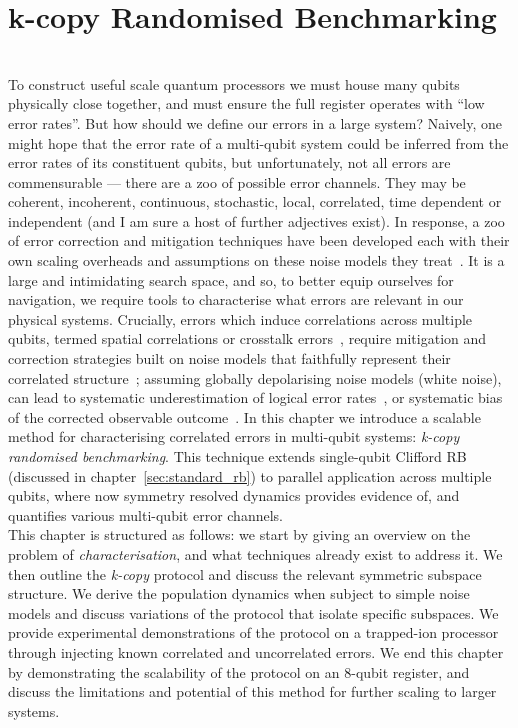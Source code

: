 \chapter{k-copy Randomised Benchmarking}
\minitoc
 \\
To construct useful scale quantum processors we must house many qubits physically close together, and must ensure the full register operates with ``low error rates''. But how should we define our errors in a large system? Naively, one might hope that the error rate of a multi-qubit system could be inferred from the error rates of its constituent qubits, but unfortunately, not all errors are commensurable --- there are a zoo of possible error channels. They may be coherent, incoherent, continuous, stochastic, local, correlated, time dependent or independent (and I am sure a host of further adjectives exist).  In response, a zoo of error correction and mitigation techniques have been developed each with their own scaling overheads and assumptions on these noise models they treat~\cite{shor_fault-tolerant_1996,aharonov_fault-tolerant_2008,cai_quantum_2023}.
It is a large and intimidating search space, and so, to better equip ourselves for navigation, we require tools to characterise what errors are relevant in our physical systems. 
Crucially, errors
which induce correlations across multiple qubits, termed spatial correlations or crosstalk errors~\cite{zou_spatially_2024, sarovar_detecting_2020}, require mitigation and correction strategies built on noise
models that faithfully represent their correlated structure~\cite{layden_efficient_2020}; assuming
globally depolarising noise models (white noise), can lead to systematic underestimation of logical error rates~\cite{aharonov_fault-tolerant_2006, preskill_sufficient_2013}, or systematic bias of the corrected observable outcome~\cite{foldager_can_2024}.
In this chapter we introduce a scalable method for characterising correlated errors in multi-qubit systems: \emph{k-copy randomised benchmarking}. This technique extends single-qubit
Clifford RB~\cite{magesan_scalable_2011,knill_randomized_2008,dankert_exact_2009} (discussed in chapter~\ref{sec:standard_rb}) to parallel application across multiple qubits, where now symmetry resolved dynamics provides evidence of, and quantifies various multi-qubit error channels.\\
This chapter is structured as follows: we start by giving an overview on the problem of \emph{characterisation}, and what techniques already exist to address it. We then outline the \emph{k-copy} protocol and discuss the relevant symmetric subspace structure. We derive the population dynamics when subject to simple noise models and discuss variations of the protocol that isolate specific subspaces. We provide experimental demonstrations of the protocol on a trapped-ion processor through injecting known correlated and uncorrelated errors. We end this chapter by demonstrating the scalability of the protocol on an 8-qubit register, and discuss the limitations and potential of this method for further scaling to larger systems.

